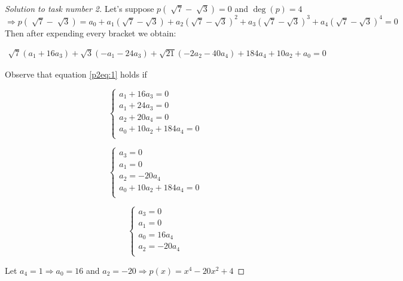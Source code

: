 \documentclass[12pt,a4paper]{article}
\begin{document}
\begin{proof}[Solution to task number 2]

Let's suppose $p(\sqrt[]{7}-\sqrt[]{3})=0$ and $\deg(p)=4$ $\Rightarrow p(\sqrt[]{7}-\sqrt[]{3})= a_0+a_1(\sqrt{7}-\sqrt{3})+a_2(\sqrt{7}-\sqrt{3})^2+a_3(\sqrt{7}-\sqrt{3})^3+a_4(\sqrt{7}-\sqrt{3})^4=0$\\
Then after expending every bracket we obtain:

\begin{align}
\sqrt{7}(a_1+16a_3)+\sqrt{3}(-a_1-24a_3)+\sqrt{21}(-2a_2-40a_4)+184a_4+10a_2+a_0=0\label{p2eq:1}
\end{align}

Observe that equation \eqref{p2eq:1} holds if

$$\left\{\begin{array}{rcl}
a_1+16a_3=0\\
a_1+24a_3=0\\
a_2+20a_4=0\\
a_0+10a_2+184a_4=0\\
\end{array} \right.$$

$$\left\{\begin{array}{rcl}
a_3=0\\
a_1=0\\
a_2=-20a_4\\
a_0+10a_2+184a_4=0\\
\end{array} \right.$$

$$\left\{\begin{array}{rcl}
a_3=0\\
a_1=0\\
a_0=16a_4\\
a_2=-20a_4\\
\end{array} \right.$$

Let $a_4=1  \Rightarrow a_0=16$ and $a_2=-20 \Rightarrow p(x)=x^4-20x^2+4$ 

\end{proof}
\vspace{1cm}
\end{document}
